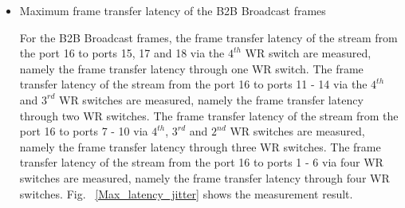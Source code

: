 \begin{itemize}

    \item Maximum frame transfer latency of the B2B Broadcast frames

For the B2B Broadcast frames, the frame transfer latency of the stream from the port 16 to ports 15, 17 and 18 via the $4^{th}$ WR switch are measured, namely the frame transfer latency through one WR switch. The frame transfer latency of the stream from the port 16 to ports 11 - 14 via the $4^{th}$ and $3^{rd}$ WR switches are measured, namely the frame transfer latency through two WR switches. The frame transfer latency of the stream from the port 16 to ports 7 - 10 via $4^{th}$, $3^{rd}$ and $2^{nd}$ WR switches are measured, namely the frame transfer latency through three WR switches. The frame transfer latency of the stream from the port 16 to ports 1 - 6 via four WR switches are measured, namely the frame transfer latency through four WR switches. Fig. ~\ref{Max_latency_jitter} shows the measurement result.
  

\end{itemize}

